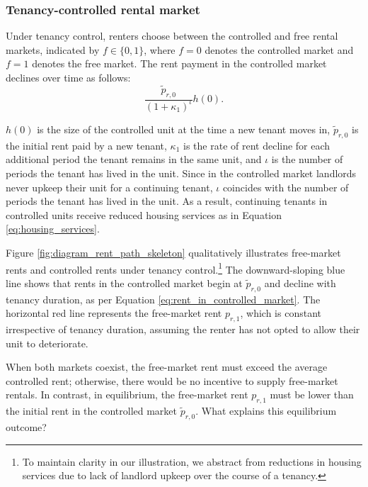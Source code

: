 \documentclass[parskip=full]{article}
\begin{document}
\subsubsection{Tenancy-controlled rental market}

Under tenancy control, renters choose between the controlled and free rental markets, indicated by $f \in \{0,1\}$, where $f=0$ denotes the controlled market and $f=1$ denotes the free market. The rent payment in the controlled market declines over time as follows:
\begin{equation}\label{eq:rent_in_controlled_market}
\frac{\tilde{p}_{r,0}}{(1+\kappa_{1})^{\iota}} h(0).
\end{equation} 

\noindent $h(0)$ is the size of the controlled unit at the time a new tenant moves in, $\tilde{p}_{r,0}$ is the initial rent paid by a new tenant, $\kappa_{1}$ is the rate of rent decline for each additional period the tenant remains in the same unit, and $\iota$ is the number of periods the tenant has lived in the unit. Since in the controlled market landlords never upkeep their unit for a continuing tenant, $\iota$ coincides with the number of periods the tenant has lived in the unit. As a result, continuing tenants in controlled units receive reduced housing services as in Equation \eqref{eq:housing_services}.

Figure \ref{fig:diagram_rent_path_skeleton} qualitatively illustrates free-market rents and controlled rents under tenancy control.\footnote{To maintain clarity in our illustration, we abstract from reductions in housing services due to lack of landlord upkeep over the course of a tenancy.} The downward-sloping blue line shows that rents in the controlled market begin at $\tilde{p}_{r,0}$ and decline with tenancy duration, as per Equation \eqref{eq:rent_in_controlled_market}. The horizontal red line represents the free-market rent $p_{r,1}$, which is constant irrespective of tenancy duration, assuming the renter has not opted to allow their unit to deteriorate. 

When both markets coexist, the free-market rent must exceed the average controlled rent; otherwise, there would be no incentive to supply free-market rentals. In contrast, in equilibrium, the free-market rent $p_{r,1}$ must be lower than the initial rent in the controlled market $\tilde{p}_{r,0}$. What explains this equilibrium outcome?
\end{document}
